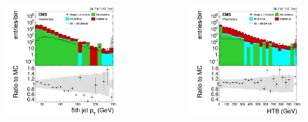 \documentclass{beamer}
\begin{document}
\begin{frame}
\begin{itemize}
\begin{columns}
		 \begin{figure} \includegraphics[scale=0.08]{5thjetpt.png} \end{figure}
		 \begin{figure} \includegraphics[scale=0.08]{HTB.png} \end{figure}

\end{columns}
\end{itemize}
\end{frame}
\end{document}
